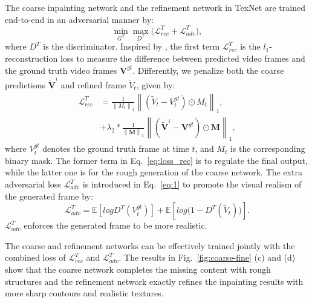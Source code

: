 The coarse inpainting network and the refinement network in TexNet are trained end-to-end in an adversarial manner by:
%
\begin{equation}
	\label{eq:1}
	\min\limits_{G^T} \max \limits_{D^T} \big(\mathcal{L}^{T}_{rec}+\mathcal{L}^T_{adv}\big),
\end{equation}
where $D^T$ is the discriminator.
%
Inspired by \cite{nazeri2019edgeconnect}, the first term $\mathcal{L}^{T}_{rec}$ is the $l_1$-reconstruction loss to measure the difference between predicted video frames and the ground truth video frames $\boldsymbol{V}^{gt}$.
Differently, we penalize both the coarse predictions $\boldsymbol{\widetilde{V}}^i$ and refined frame $\widetilde{V}_t$, given by:
\begin{equation}
		\label{eq:loss_rec}
	\begin{aligned}
		\mathcal{L}^{T}_{rec}&=\frac{1}{\left\|M_t \right\|_1}\left\|(\widetilde{V}_t-V^{gt}_t)\odot M_t\right\|_1,\\ 
		&+\lambda_2*\frac{1}{\left\|\boldsymbol{M} \right\|_1}\left\|(\boldsymbol{\widetilde{V}}^i-\boldsymbol{V}^{gt})\odot \boldsymbol{M}\right\|_1,
	\end{aligned}
\end{equation}
where $V^{gt}_t$ denotes the ground truth frame at time $t$, and $M_t$ is the corresponding binary mask. 
{\color{blue}The former term in Eq.~\ref{eq:loss_rec} is to regulate the final output, while the latter one is for the rough generation of the coarse network.}
%
%
The extra adversarial loss $\mathcal{L}^T_{adv}$ is introduced in Eq.~\eqref{eq:1} to promote the visual realism of the generated frame
 by:
	\begin{equation}
		\label{eq:inp_adver}
		\mathcal{L}^T_{adv}=\mathbb{E}[logD^T(V^{gt}_t)]+\mathbb{E}[log\big(1-D^T(\widetilde{V}_t)\big)].
	\end{equation}
$\mathcal{L}^T_{adv}$ enforces the generated frame to be more realistic.


The coarse and refinement networks can be effectively trained jointly with the combined loss of $\mathcal{L}^T_{rec}$ and $\mathcal{L}^T_{adv}$.
The results in Fig.~\ref{fig:coarse-fine} (c) and (d) show that the coarse network completes the missing content with rough structures and the refinement network exactly refines the inpainting results with more sharp contours and realistic textures.



